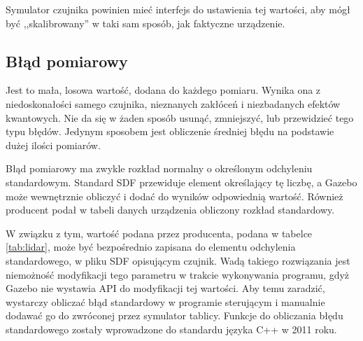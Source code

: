 		Symulator czujnika powinien mieć interfejs do ustawienia tej wartości, aby mógł być ,,skalibrowany'' w taki sam sposób, jak faktyczne urządzenie.

	\subsection{Błąd pomiarowy}
		Jest to mała, losowa wartość, dodana do każdego pomiaru.
		Wynika ona z niedoskonałości samego czujnika, nieznanych zakłóceń i niezbadanych efektów kwantowych.
		Nie da się w żaden sposób usunąć, zmniejszyć, lub przewidzieć tego typu błędów.
		Jedynym sposobem jest obliczenie średniej błędu na podstawie dużej ilości pomiarów.

		Błąd pomiarowy ma zwykle rozkład normalny o określonym odchyleniu standardowym.
		Standard SDF przewiduje element określający tę liczbę, a Gazebo może wewnętrznie obliczyć i dodać do wyników odpowiednią wartość.
		Również producent podał w tabeli danych urządzenia obliczony rozkład standardowy.

		W związku z tym, wartość podana przez producenta, podana w tabelce \ref{tab:lidar}, może być bezpośrednio zapisana do 
		elementu odchylenia standardowego, w pliku SDF opisującym czujnik.
		Wadą takiego rozwiązania jest niemożność modyfikacji tego parametru w trakcie wykonywania programu, gdyż Gazebo nie wystawia API do modyfikacji tej wartości.
		Aby temu zaradzić, wystarczy obliczać błąd standardowy w programie sterującym i manualnie dodawać go do zwróconej przez symulator tablicy.
		Funkcje do obliczania błędu standardowego zostały wprowadzone do standardu języka C++ w 2011 roku.



